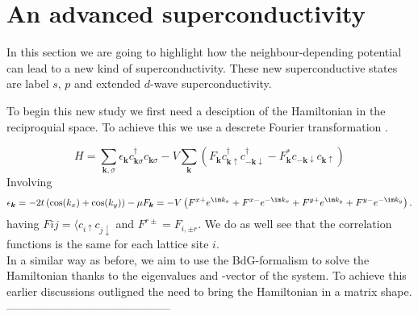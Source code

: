 \documentclass[../main.tex]{subfile}
\begin{document}
\section{An advanced superconductivity}
In this section we are going to highlight how the neighbour-depending potential can lead to a new kind of superconductivity.
These new superconductive states are label $s$, $p$ and extended $d$-wave superconductivity.

To begin this new study we first need a desciption of the Hamiltonian in the reciproquial space. 
To achieve this we use a descrete Fourier transformation .

\begin{equation*}
    H = \sum_{\bm{k},\sigma} \epsilon_{\bm{k}} c_{\bm{k}\sigma}^{\dagger} c_{\bm{k}\sigma} 
    - V \sum_{\bm{k}} \left( F_{\bm{k}} c^{\dagger}_{\bm{k}\uparrow} c^{\dagger}_{-\bm{k}\downarrow}
    - F_{\bm{k}}^{\ast} c_{-\bm{k}\downarrow} c_{\bm{k}\uparrow} \right)
\end{equation*}
Involving 
\begin{equation*}
    \epsilon_{\bm{k}} = -2t \left( \cos(k_x) + \cos(k_y) \right) - \mu\\
    F_{\bm{k}} = - V \left(F^{x+} e^{\im k_x} + F^{x-}e^{-\im k_x} + F^{y+} e^{\im k_y} + F^{y-}e^{-\im k_y} \right). 
\end{equation*}
having $F{ij} = \langle c_{i\uparrow} c_{j\downarrow}$ and $F^{r\pm} = F_{i, \pm r}$. We do as well see that the correlation functions is the same
for each lattice site $i$.\\

In a similar way as before, we aim to use the BdG-formalism to solve the Hamiltonian thanks to the eigenvalues and -vector of the system.
To achieve this earlier discussions outligned the need to bring the Hamiltonian in a matrix shape.\\

--------------------------------------------\\
\end{document}
